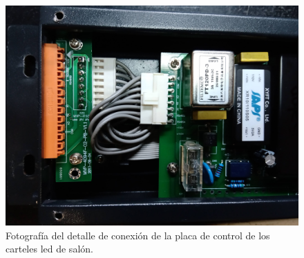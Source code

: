 \begin{figure}[ht]
	\centering
	\includegraphics[width=1\textwidth]{./Figures/displayController.jpg}
	\caption{Fotografía del detalle de conexión de la placa de control de los carteles led de salón.}
	\label{fig:displayController}
\end{figure}